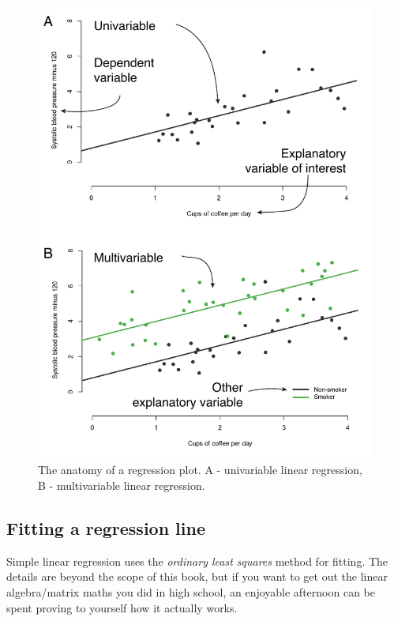 \documentclass[
  12pt,
  krantz2]{krantz}
\begin{document}
\begin{figure}
\centering
\includegraphics{images/chapter07/1_regression_terms.pdf}
\caption{\label{fig:chap07-fig-regression}The anatomy of a regression plot. A - univariable linear regression, B - multivariable linear regression.}
\end{figure}

\hypertarget{chap07-linreg-fit}{%
\subsection{Fitting a regression line}\label{chap07-linreg-fit}}


Simple linear regression uses the \emph{ordinary least squares} method for fitting.
The details are beyond the scope of this book, but if you want to get out the linear algebra/matrix maths you did in high school, an enjoyable afternoon can be spent proving to yourself how it actually works.
\end{document}
